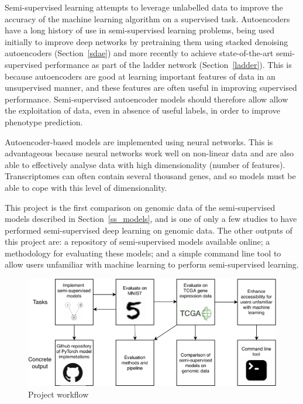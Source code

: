 Semi-supervised learning attempts to leverage unlabelled data to improve the accuracy of the machine learning
algorithm on a supervised task. Autoencoders have a long history of use in semi-supervised learning problems,
being used initially to improve deep networks by pretraining them using stacked denoising autoencoders (Section~\ref{sdae})
and more recently to achieve state-of-the-art semi-supervised performance as part of the ladder 
network (Section~\ref{ladder}). This is because autoencoders are good at learning 
important features of data in an unsupervised manner, and these features are often useful in improving 
supervised performance. Semi-supervised autoencoder models should therefore allow 
allow the exploitation of data, even in absence of useful labels, in order to improve phenotype prediction.

Autoencoder-based models are implemented
using neural networks. This is advantageous because neural networks work well on non-linear data and are
also able to effectively analyse data with high dimensionality (number of features). Transcriptomes can
often contain several thousand genes, and so models must be able to cope with this level of dimensionality.

This project is the first comparison on genomic data of the semi-supervised models described in Section~\ref{ss_models}, and is one of only a few
studies to have performed semi-supervised deep learning on genomic data. The other outputs of this project are: a repository of semi-supervised
models available online; a methodology for evaluating these models; and a simple command line tool to allow
users unfamiliar with machine learning to perform semi-supervised learning.

\begin{figure}[H]
\centering\includegraphics[scale=.9]{figs/workflow.pdf}
\caption{Project workflow}
\label{fig:workflow}
\end{figure}


